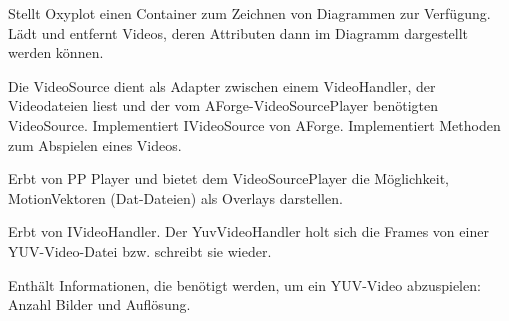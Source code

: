 Stellt Oxyplot einen Container zum Zeichnen von Diagrammen zur Verfügung. Lädt und entfernt Videos, deren Attributen dann im Diagramm dargestellt werden können.


Die VideoSource dient als Adapter zwischen einem VideoHandler, der Videodateien liest und der vom AForge-VideoSourcePlayer benötigten VideoSource.
Implementiert IVideoSource von AForge. Implementiert Methoden zum Abspielen eines Videos.


Erbt von PP Player und bietet dem VideoSourcePlayer die Möglichkeit, MotionVektoren (Dat-Dateien) als Overlays darstellen.


Erbt von IVideoHandler. Der YuvVideoHandler holt sich die Frames von einer YUV-Video-Datei bzw. schreibt sie wieder.


Enthält Informationen, die benötigt werden, um ein YUV-Video abzuspielen: Anzahl Bilder und Auflösung.



\pagebreak
